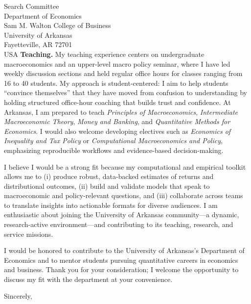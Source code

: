 \documentclass[11pt,letterpaper]{letter}
\begin{document}
\begin{letter}{Search Committee \\
Department of Economics \\
Sam M. Walton College of Business \\
University of Arkansas \\
Fayetteville, AR 72701 \\ USA}
\textbf{Teaching.} My teaching experience centers on undergraduate macroeconomics and an upper-level macro policy seminar, where I have led weekly discussion sections and held regular office hours for classes ranging from 16 to 40 students. My approach is student-centered: I aim to help students “convince themselves” that they have moved from confusion to understanding by holding structured office-hour coaching that builds trust and confidence. At Arkansas, I am prepared to teach \textit{Principles of Macroeconomics}, \textit{Intermediate Macroeconomic Theory}, \textit{Money and Banking}, and \textit{Quantitative Methods for Economics}. I would also welcome developing electives such as \textit{Economics of Inequality and Tax Policy} or \textit{Computational Macroeconomics and Policy}, emphasizing reproducible workflows and evidence-based decision-making.

I believe I would be a strong fit because my computational and empirical toolkit allows me to (i) produce robust, data-backed estimates of returns and distributional outcomes, (ii) build and validate models that speak to macroeconomic and policy-relevant questions, and (iii) collaborate across teams to translate insights into actionable formats for diverse audiences. I am enthusiastic about joining the University of Arkansas community—a dynamic, research-active environment—and contributing to its teaching, research, and service missions.

I would be honored to contribute to the University of Arkansas’s Department of Economics and to mentor students pursuing quantitative careers in economics and business. Thank you for your consideration; I welcome the opportunity to discuss my fit with the department at your convenience.

\closing{Sincerely,}

\end{letter}
\end{document}
